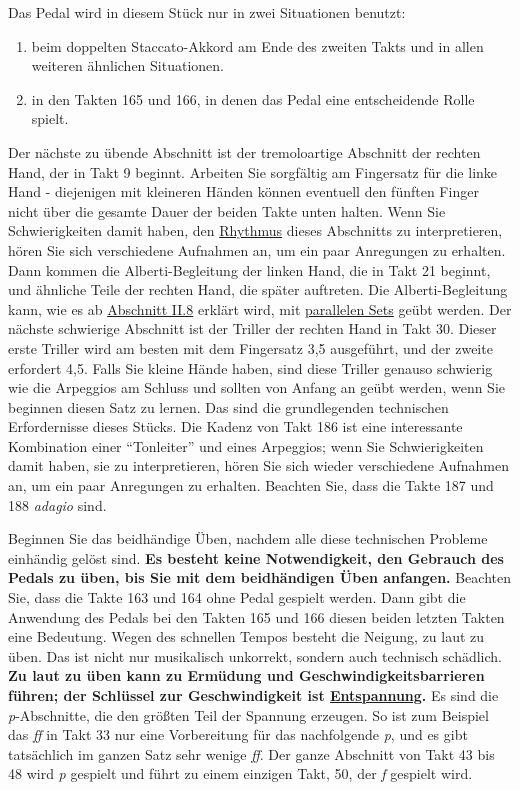 Das Pedal wird in diesem Stück nur in zwei Situationen benutzt:

\begin{enumerate} 
 \item beim doppelten Staccato-Akkord am Ende des zweiten Takts und in allen weiteren ähnlichen Situationen.
 \item in den Takten 165 und 166, in denen das Pedal eine entscheidende Rolle spielt.
 \end{enumerate}
Der nächste zu übende Abschnitt ist der tremoloartige Abschnitt der rechten Hand, der in Takt 9 beginnt.
Arbeiten Sie sorgfältig am Fingersatz für die linke Hand - diejenigen mit kleineren Händen können eventuell den fünften Finger nicht über die gesamte Dauer der beiden Takte unten halten.
Wenn Sie Schwierigkeiten damit haben, den \hyperlink{c1iii1b}{Rhythmus} dieses Abschnitts zu interpretieren, hören Sie sich verschiedene Aufnahmen an, um ein paar Anregungen zu erhalten.
Dann kommen die Alberti-Begleitung der linken Hand, die in Takt 21 beginnt, und ähnliche Teile der rechten Hand, die später auftreten.
Die Alberti-Begleitung kann, wie es ab \hyperlink{c1ii8}{Abschnitt II.8} erklärt wird, mit \hyperlink{c1iii7b}{parallelen Sets} geübt werden.
Der nächste schwierige Abschnitt ist der Triller der rechten Hand in Takt 30.
Dieser erste Triller wird am besten mit dem Fingersatz 3,5 ausgeführt, und der zweite erfordert 4,5.
Falls Sie kleine Hände haben, sind diese Triller genauso schwierig wie die Arpeggios am Schluss und sollten von Anfang an geübt werden, wenn Sie beginnen diesen Satz zu lernen.
Das sind die grundlegenden technischen Erfordernisse dieses Stücks.
Die Kadenz von Takt 186 ist eine interessante Kombination einer \enquote{Tonleiter} und eines Arpeggios; wenn Sie Schwierigkeiten damit haben, sie zu interpretieren, hören Sie sich wieder verschiedene Aufnahmen an, um ein paar Anregungen zu erhalten.
Beachten Sie, dass die Takte 187 und 188 \textit{adagio} sind.

Beginnen Sie das beidhändige Üben, nachdem alle diese technischen Probleme einhändig gelöst sind.
\textbf{Es besteht keine Notwendigkeit, den Gebrauch des Pedals zu üben, bis Sie mit dem beidhändigen Üben anfangen.}
Beachten Sie, dass die Takte 163 und 164 ohne Pedal gespielt werden.
Dann gibt die Anwendung des Pedals bei den Takten 165 und 166 diesen beiden letzten Takten eine Bedeutung.
Wegen des schnellen Tempos besteht die Neigung, zu laut zu üben.
Das ist nicht nur musikalisch unkorrekt, sondern auch technisch schädlich.
\textbf{Zu laut zu üben kann zu Ermüdung und Geschwindigkeitsbarrieren führen; der Schlüssel zur Geschwindigkeit ist \hyperlink{c1ii14}{Entspannung}.}
Es sind die \textit{p}-Abschnitte, die den größten Teil der Spannung erzeugen.
So ist zum Beispiel das \textit{ff} in Takt 33 nur eine Vorbereitung für das nachfolgende \textit{p}, und es gibt tatsächlich im ganzen Satz sehr wenige \textit{ff}.
Der ganze Abschnitt von Takt 43 bis 48 wird \textit{p} gespielt und führt zu einem einzigen Takt, 50, der \textit{f} gespielt wird.

